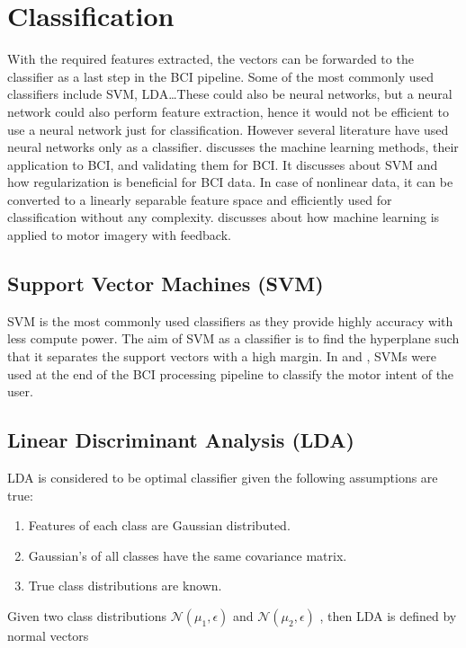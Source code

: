 \section{Classification} \label{clasff}
With the required features extracted, the vectors can be forwarded to the classifier as a last step in the BCI pipeline. Some of the most commonly used classifiers include SVM, LDA\dots These could also be neural networks, but a neural network could also perform feature extraction, hence it would not be efficient to use a neural network just for classification. However several literature have used neural networks only as a classifier.
\cite{2004_EEG_ML} discusses the machine learning methods, their application to BCI, and validating them for BCI. It discusses about SVM and how regularization is beneficial for BCI data. In case of nonlinear data, it can be converted to a linearly separable feature space and efficiently used for classification without any complexity. \cite{2006_EEG_ML_BrainState} discusses about how machine learning is applied to motor imagery with feedback.

\subsection{Support Vector Machines (SVM)}
SVM is the most commonly used classifiers as they provide highly accuracy with less compute power. The aim of SVM as a classifier is to find the hyperplane such that it separates the support vectors with a high margin. 
In \cite{2018_BCI_SVM_DNN} and \cite{2021_Feat_MI_TF_ICA_SVM}, SVMs were used at the end of the BCI processing pipeline to classify the motor intent of the user.

\subsection{Linear Discriminant Analysis (LDA)}
LDA  is considered to be optimal classifier given the following assumptions are true:
\begin{enumerate}
    \item Features of each class are Gaussian distributed.
    \item Gaussian's of all classes have the same covariance matrix.
    \item True class distributions are known.
\end{enumerate}

Given two class distributions $\mathcal{N} (\mu_1, \epsilon )$ and $\mathcal{N} (\mu_2, \epsilon  )$ , then LDA is defined by normal vectors

